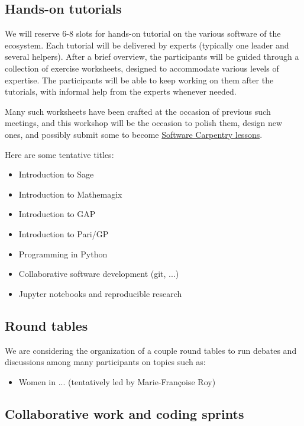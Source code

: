\documentclass[12pt]{amsbook}
\begin{document}
\subsection{Hands-on tutorials}

We will reserve 6-8 slots for hands-on tutorial on the various
software of the ecosystem. Each tutorial will be delivered by experts
(typically one leader and several helpers). After a brief overview,
the participants will be guided through a collection of exercise
worksheets, designed to accommodate various levels of expertise.  The
participants will be able to keep working on them after the tutorials,
with informal help from the experts whenever needed.

Many such worksheets have been crafted at the occasion of previous
such meetings, and this workshop will be the occasion to polish them,
design new ones, and possibly submit some to become
\href{http://software-carpentry.org/lessons/}{Software Carpentry
  lessons}.

Here are some tentative titles:
\begin{itemize}
\item Introduction to Sage
\item Introduction to Mathemagix
\item Introduction to GAP
\item Introduction to Pari/GP
\item Programming in Python
\item Collaborative software development (git, ...)
\item Jupyter notebooks and reproducible research
\end{itemize}

\subsection{Round tables}

We are considering the organization of a couple round tables to run
debates and discussions among many participants on topics such as:

\begin{itemize}
\item Women in ... (tentatively led by Marie-Françoise Roy)
\end{itemize}

\subsection{Collaborative work and coding sprints}
\end{document}

